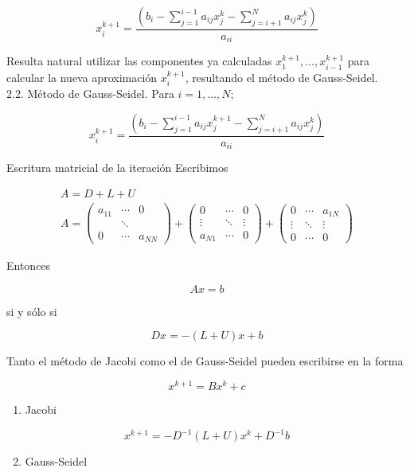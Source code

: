 \documentclass[10pt]{article}
\begin{document}
$$
x_{i}^{k+1}=\frac{\left(b_{i}-\sum_{j=1}^{i-1} a_{i j} x_{j}^{k}-\sum_{j=i+1}^{N} a_{i j} x_{j}^{k}\right)}{a_{i i}}
$$

Resulta natural utilizar las componentes ya calculadas $x_{1}^{k+1}, \ldots, x_{i-1}^{k+1}$ para calcular la nueva aproximación $x_{i}^{k+1}$, resultando el método de Gauss-Seidel.\\
2.2. Método de Gauss-Seidel. Para $i=1, \ldots, N$;

$$
x_{i}^{k+1}=\frac{\left(b_{i}-\sum_{j=1}^{i-1} a_{i j} x_{j}^{k+1}-\sum_{j=i+1}^{N} a_{i j} x_{j}^{k}\right)}{a_{i i}}
$$

Escritura matricial de la iteración Escribimos

$$
\begin{gathered}
A=D+L+U \\
A=\left(\begin{array}{ccc}
a_{11} & \cdots & 0 \\
& \ddots & \\
0 & \cdots & a_{N N}
\end{array}\right)+\left(\begin{array}{ccc}
0 & \cdots & 0 \\
\vdots & \ddots & \vdots \\
a_{N 1} & \cdots & 0
\end{array}\right)+\left(\begin{array}{ccc}
0 & \cdots & a_{1 N} \\
\vdots & \ddots & \vdots \\
0 & \cdots & 0
\end{array}\right)
\end{gathered}
$$

Entonces

$$
A x=b
$$

si y sólo si

$$
D x=-(L+U) x+b
$$

Tanto el método de Jacobi como el de Gauss-Seidel pueden escribirse en la forma

$$
x^{k+1}=B x^{k}+c
$$

\begin{enumerate}
  \item Jacobi
\end{enumerate}

$$
x^{k+1}=-D^{-1}(L+U) x^{k}+D^{-1} b
$$

\begin{enumerate}
  \setcounter{enumi}{1}
  \item Gauss-Seidel
\end{enumerate}
\end{document}
